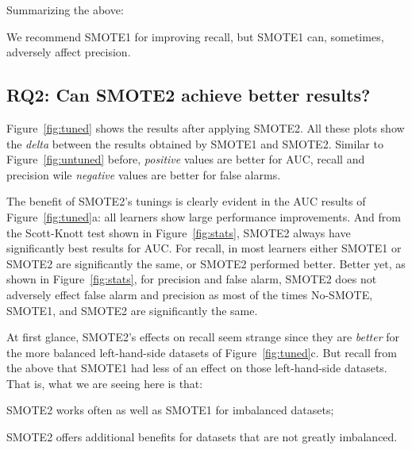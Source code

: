 
\noindent
Summarizing the above:
\begin{lesson1}
We recommend SMOTE1 for improving recall, but SMOTE1 can,
sometimes, adversely affect
precision.
\end{lesson1}

\subsection{\textbf{RQ2: Can SMOTE2 achieve better results?}}

Figure~\ref{fig:tuned} shows the results
after applying SMOTE2. All these
plots show the {\em delta} between
the results obtained by SMOTE1 and SMOTE2.
Similar to Figure~\ref{fig:untuned} before, {\em positive}  values
are better for AUC, recall and precision
wile {\em negative} values are better for false alarms.

The benefit of SMOTE2's tunings is clearly evident in the AUC results of  Figure~\ref{fig:tuned}a:
all learners show large performance improvements. And from the Scott-Knott test shown in Figure~\ref{fig:stats}, SMOTE2 always have significantly best results for AUC. For recall, in most learners either SMOTE1 or SMOTE2 are significantly the same, or SMOTE2 performed better. 
Better yet,  as
shown in
Figure~\ref{fig:stats}, for precision and false alarm, SMOTE2 does
not adversely effect false alarm and precision as most of the times No-SMOTE, SMOTE1, and SMOTE2 are significantly the same.


At first glance, SMOTE2's effects on recall seem strange since they are
{\em better} for the more balanced left-hand-side datasets of
Figure~\ref{fig:tuned}c.  But recall from the above that SMOTE1 had less
of an effect on those left-hand-side datasets. That is, what we are seeing
here is that:
\bi
\item
SMOTE2 works often as well as SMOTE1 for imbalanced datasets;
\item
SMOTE2 offers additional benefits for datasets that are not greatly
imbalanced.
\ei


